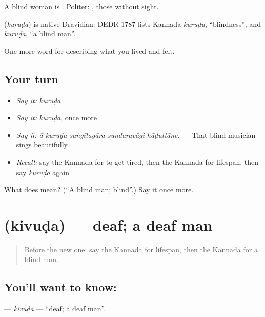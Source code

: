 A blind woman is . Politer:  , those without sight.

\begin{cousinweb}
\textbf{} (\emph{kuruḍa}) is native Dravidian: DEDR 1787 lists Kannada \emph{kuruḍu}, \textquotedblleft{}blindness\textquotedblright{}, and \emph{kuruḍa}, \textquotedblleft{}a blind man\textquotedblright{}.
\end{cousinweb}

\begin{grammarlens}[title={What you've built}]
One more word for describing what you lived and felt.
\end{grammarlens}

\subsection*{Your turn}
\begin{itemize}
\raggedright
  \item \emph{Say it:} \emph{kuruḍa}
  \item \emph{Say it:} \emph{kuruḍa}, once more
  \item \emph{Say it:} \emph{ā kuruḍa saṅgītagāra sundaravāgi hāḍuttāne.} — That blind musician sings beautifully.
  \item \emph{Recall:} say the Kannada for to get tired, then the Kannada for lifespan, then say \emph{kuruḍa} again
\end{itemize}

\begin{tcolorbox}[breakable,colback=teal!4,colframe=teal!35!black,title={Before you move on}]
What does  mean? (\textquotedblleft{}A blind man; blind\textquotedblright{}.) Say it once more.
\end{tcolorbox}
\section[\texorpdfstring{\kn{ಕಿವುಡ} (kivuḍa)}{ಕಿವುಡ (kivuḍa)}]{ (kivuḍa) — deaf; a deaf man}

\label{lesson:KA-C515-kivuda}



\begin{quote}
Before the new one: say the Kannada for lifespan, then the Kannada for a blind man.
\end{quote}

\subsection*{You'll want to know: }
\textbf{} — \emph{kivuḍa} — \textquotedblleft{}deaf; a deaf man\textquotedblright{}.

